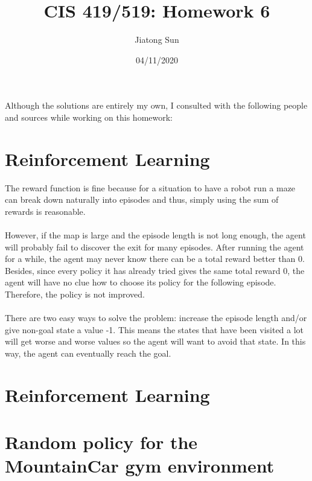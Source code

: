 \documentclass{article}
\title{CIS 419/519: Homework 6}
\author{Jiatong Sun}
\date{04/11/2020}
\begin{document}
    \maketitle
    \noindent
    Although the solutions are entirely my own, I consulted with the following people and sources while working on this homework: 
    
    \section{Reinforcement Learning \uppercase\expandafter{}}
    \noindent
    The reward function is fine because for a situation to have a robot run a maze can break down naturally into episodes and thus, simply using the sum of rewards is reasonable.\\\\
    However, if the map is large and the episode length is not long enough, the agent will probably fail to discover the exit for many episodes. After running the agent for a while, the agent may never know there can be a total reward better than 0. Besides, since every policy it has already tried gives the same total reward 0, the agent will have no clue how to choose its policy for the following episode. Therefore, the policy is not improved.\\\\
    There are two easy ways to solve the problem: increase the episode length and/or give non-goal state a value -1. This means the states that have been visited a lot will get worse and worse values so the agent will want to avoid that state. In this way, the agent can eventually reach the goal.
        
    \section{Reinforcement Learning \uppercase\expandafter{}}
    	
    \section{Random policy for the MountainCar gym environment}
       
\end{document}
